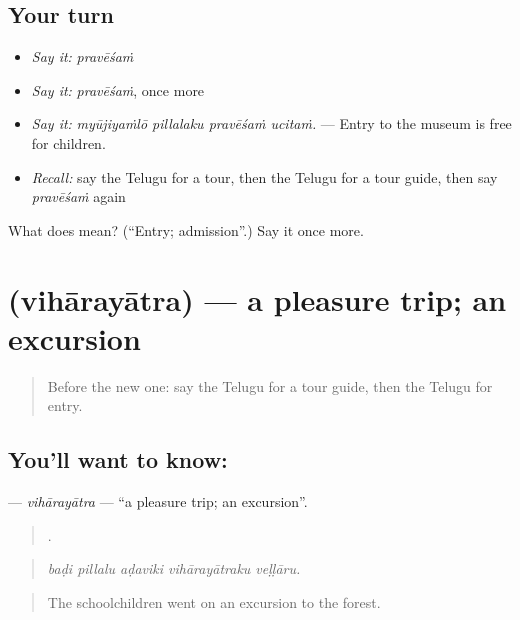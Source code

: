 \subsection*{Your turn}
\begin{itemize}
\raggedright
  \item \emph{Say it:} \emph{pravēśaṁ}
  \item \emph{Say it:} \emph{pravēśaṁ}, once more
  \item \emph{Say it:} \emph{myūjiyaṁlō pillalaku pravēśaṁ ucitaṁ.} — Entry to the museum is free for children.
  \item \emph{Recall:} say the Telugu for a tour, then the Telugu for a tour guide, then say \emph{pravēśaṁ} again
\end{itemize}

\begin{tcolorbox}[breakable,colback=teal!4,colframe=teal!35!black,title={Before you move on}]
What does  mean? (\textquotedblleft{}Entry; admission\textquotedblright{}.) Say it once more.
\end{tcolorbox}
\section[\texorpdfstring{\te{విహారయాత్ర} (vihārayātra)}{విహారయాత్ర (vihārayātra)}]{ (vihārayātra) — a pleasure trip; an excursion}

\label{lesson:TE-C455-viharayatra}



\begin{quote}
Before the new one: say the Telugu for a tour guide, then the Telugu for entry.
\end{quote}

\subsection*{You'll want to know: }
\textbf{} — \emph{vihārayātra} — \textquotedblleft{}a pleasure trip; an excursion\textquotedblright{}.

\begin{quote}
    .
\end{quote}

\begin{quote}
\emph{baḍi pillalu aḍaviki vihārayātraku veḷḷāru.}
\end{quote}

\begin{quote}
The schoolchildren went on an excursion to the forest.
\end{quote}

